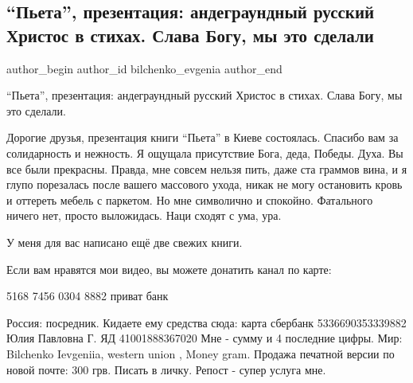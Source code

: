  
 
 
 
 
 
\subsection{\enquote{Пьета}, презентация: андеграундный русский Христос в стихах. Слава Богу, мы это сделали}
\label{sec:12_06_2021.fb.bilchenko_evgenia.8.pjeta_prezentacia_hristos_kniga}
\ifcmt
 author_begin
   author_id bilchenko_evgenia
 author_end
\fi

\enquote{Пьета}, презентация: андеграундный русский Христос в стихах. Слава Богу, мы это сделали.

Дорогие друзья, презентация книги \enquote{Пьета} в Киеве состоялась. Спасибо
вам за солидарность и нежность. Я ощущала присутствие Бога, деда, Победы. Духа.
Вы все были прекрасны. Правда, мне совсем нельзя пить, даже ста граммов вина, и
я глупо порезалась после вашего массового ухода, никак не могу остановить кровь
и оттереть мебель с паркетом. Но мне символично и спокойно. Фатального ничего
нет, просто выложидась. Наци сходят с ума, ура. 

У меня для вас написано ещё две свежих книги. 

Если вам нравятся мои видео, вы можете донатить канал по карте:

5168 7456 0304 8882 приват банк

Россия: посредник. Кидаете ему средства сюда: карта сбербанк 5336690353339882
Юлия Павловна Г.
ЯД 41001888367020
Мне - сумму и 4 последние цифры.
Мир: Bilchenko Ievgeniia, western union , Money gram.
Продажа печатной версии по новой почте: 300 грв. Писать в личку. Репост - супер услуга мне.


